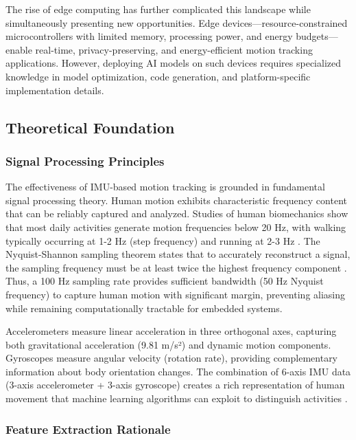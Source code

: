 The rise of edge computing has further complicated this landscape while simultaneously presenting new opportunities. Edge devices—resource-constrained microcontrollers with limited memory, processing power, and energy budgets—enable real-time, privacy-preserving, and energy-efficient motion tracking applications. However, deploying AI models on such devices requires specialized knowledge in model optimization, code generation, and platform-specific implementation details.

\subsection{Theoretical Foundation}

\subsubsection{Signal Processing Principles}

The effectiveness of IMU-based motion tracking is grounded in fundamental signal processing theory. Human motion exhibits characteristic frequency content that can be reliably captured and analyzed. Studies of human biomechanics show that most daily activities generate motion frequencies below 20 Hz, with walking typically occurring at 1-2 Hz (step frequency) and running at 2-3 Hz \cite{whittle2014gait}. The Nyquist-Shannon sampling theorem states that to accurately reconstruct a signal, the sampling frequency must be at least twice the highest frequency component \cite{oppenheim1999discrete}. Thus, a 100 Hz sampling rate provides sufficient bandwidth (50 Hz Nyquist frequency) to capture human motion with significant margin, preventing aliasing while remaining computationally tractable for embedded systems.

Accelerometers measure linear acceleration in three orthogonal axes, capturing both gravitational acceleration (9.81 m/s²) and dynamic motion components. Gyroscopes measure angular velocity (rotation rate), providing complementary information about body orientation changes. The combination of 6-axis IMU data (3-axis accelerometer + 3-axis gyroscope) creates a rich representation of human movement that machine learning algorithms can exploit to distinguish activities \cite{filippeschi2017survey_imu}.

\subsubsection{Feature Extraction Rationale}

